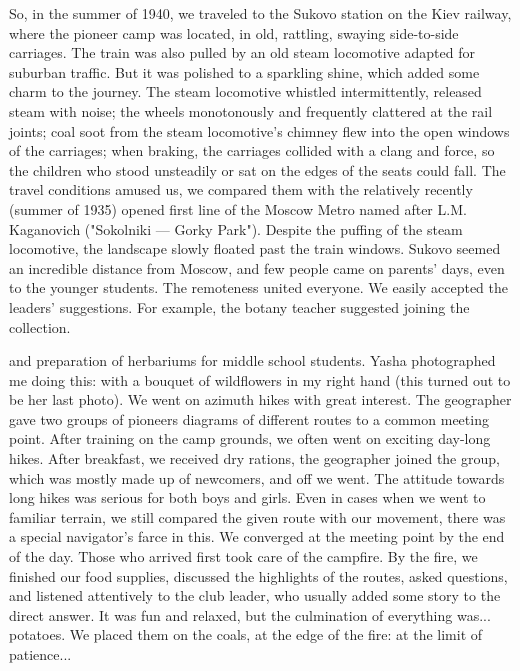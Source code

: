 \label{17-1}
So, in the summer of 1940, we traveled to the Sukovo station on the Kiev railway, where the pioneer camp was located, in old, rattling, swaying side-to-side carriages. The train was also pulled by an old steam locomotive adapted for suburban traffic. But it was polished to a sparkling shine, which added some charm to the journey. The steam locomotive whistled intermittently, released steam with noise; the wheels monotonously and frequently clattered at the rail joints; coal soot from the steam locomotive's chimney flew into the open windows of the carriages; when braking, the carriages collided with a clang and force, so the children who stood unsteadily or sat on the edges of the seats could fall. The travel conditions amused us, we compared them with the relatively recently (summer of 1935) opened first line of the Moscow Metro named after L.M. Kaganovich ("Sokolniki — Gorky Park"). Despite the puffing of the steam locomotive, the landscape slowly floated past the train windows. Sukovo seemed an incredible distance from Moscow, and few people came on parents' days, even to the younger students. The remoteness united everyone. We easily accepted the leaders' suggestions. For example, the botany teacher suggested joining the collection.

\label{18-1}
and preparation of herbariums for middle school students. Yasha photographed me doing this: with a bouquet of wildflowers in my right hand (this turned out to be her last photo). We went on azimuth hikes with great interest. The geographer gave two groups of pioneers diagrams of different routes to a common meeting point. After training on the camp grounds, we often went on exciting day-long hikes. After breakfast, we received dry rations, the geographer joined the group, which was mostly made up of newcomers, and off we went. The attitude towards long hikes was serious for both boys and girls. Even in cases when we went to familiar terrain, we still compared the given route with our movement, there was a special navigator's farce in this. We converged at the meeting point by the end of the day. Those who arrived first took care of the campfire. By the fire, we finished our food supplies, discussed the highlights of the routes, asked questions, and listened attentively to the club leader, who usually added some story to the direct answer. It was fun and relaxed, but the culmination of everything was... potatoes. We placed them on the coals, at the edge of the fire: at the limit of patience...

